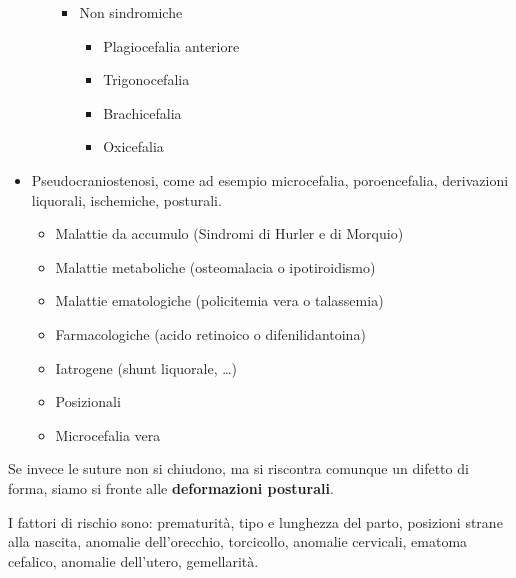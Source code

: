 \begin{itemize}
\begin{itemize}
\begin{itemize}
		\item Non sindromiche												               							%
			\begin{itemize}														                						%
			\item Plagiocefalia anteriore								          								%
			\item Trigonocefalia												            							%
			\item Brachicefalia												              							%
			\item Oxicefalia												              								%
			\end{itemize}													                  							%
		\end{itemize}													                  								%
	\end{itemize}													                  									%
\item Pseudocraniostenosi, come ad esempio microcefalia, poroencefalia,			%
derivazioni liquorali, ischemiche, posturali. 															%
	\begin{itemize}																		                				%
	\item Malattie da accumulo (Sindromi di Hurler e di Morquio)							%
	\item Malattie metaboliche (osteomalacia o ipotiroidismo)				  				%
	\item Malattie ematologiche (policitemia vera o talassemia)			  				%
	\item Farmacologiche (acido retinoico o difenilidantoina)									%
	\item Iatrogene (shunt liquorale, \dots)												    			%
	\item Posizionali																				              		%
	\item Microcefalia vera															            					%
	\end{itemize}																	                  					%
\end{itemize}																		                  					%
Se invece le suture non si chiudono, ma si riscontra comunque un difetto di forma, siamo si fronte alle \textbf{deformazioni posturali}.

I fattori di rischio sono: prematurità, tipo e lunghezza del parto, posizioni strane alla nascita, anomalie dell'orecchio, torcicollo,
anomalie cervicali, ematoma cefalico, anomalie dell'utero, gemellarità.


